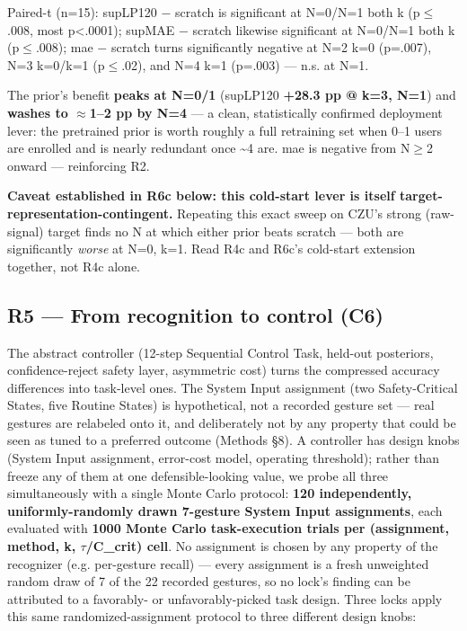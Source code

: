 Paired-t (n=15): supLP120 $-$ scratch is significant at N=0/N=1 both k (p$\le$.008, most p<.0001); supMAE $-$ scratch likewise significant at N=0/N=1 both k (p$\le$.008); mae $-$ scratch turns significantly negative at N=2 k=0 (p=.007), N=3 k=0/k=1 (p$\le$.02), and N=4 k=1 (p=.003) --- n.s. at N=1.

The prior's benefit \textbf{peaks at N=0/1} (supLP120 \textbf{+28.3 pp @ k=3, N=1}) and \textbf{washes to $\approx$1--2 pp by N=4} --- a clean, statistically confirmed deployment lever: the pretrained prior is worth roughly a full retraining set when 0--1 users are enrolled and is nearly redundant once \textasciitilde{}4 are. mae is negative from N$\ge$2 onward --- reinforcing R2.

\textbf{Caveat established in R6c below: this cold-start lever is itself target-representation-contingent.} Repeating this exact sweep on CZU's strong (raw-signal) target finds no N at which either prior beats scratch --- both are significantly \textit{worse} at N=0, k=1. Read R4c and R6c's cold-start extension together, not R4c alone.

\subsection{R5 --- From recognition to control (C6)}

The abstract controller (12-step Sequential Control Task, held-out posteriors, confidence-reject safety layer, asymmetric cost) turns the compressed accuracy differences into task-level ones. The System Input assignment (two Safety-Critical States, five Routine States) is hypothetical, not a recorded gesture set --- real gestures are relabeled onto it, and deliberately not by any property that could be seen as tuned to a preferred outcome (Methods \S{}8). A controller has design knobs (System Input assignment, error-cost model, operating threshold); rather than freeze any of them at one defensible-looking value, we probe all three simultaneously with a single Monte Carlo protocol: \textbf{120 independently, uniformly-randomly drawn 7-gesture System Input assignments}, each evaluated with \textbf{1000 Monte Carlo task-execution trials per (assignment, method, k, $\tau$/C\_crit) cell}. No assignment is chosen by any property of the recognizer (e.g. per-gesture recall) --- every assignment is a fresh unweighted random draw of 7 of the 22 recorded gestures, so no lock's finding can be attributed to a favorably- or unfavorably-picked task design. Three locks apply this same randomized-assignment protocol to three different design knobs:

